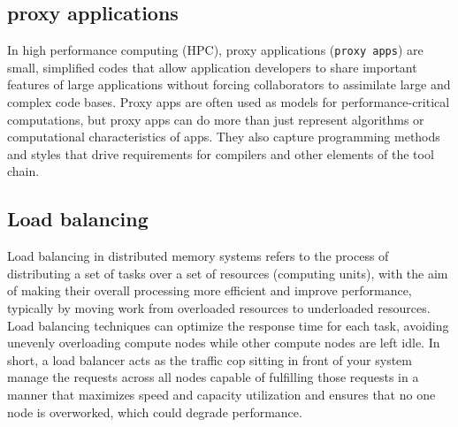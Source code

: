 \documentclass{article}
\begin{document}
\subsection{proxy applications} %
In high performance computing (HPC), proxy applications (\verb+proxy apps+) are small, simplified codes that allow application developers to share important features of large applications without forcing collaborators to assimilate large and complex code bases. 
Proxy apps are often used as models for performance-critical computations, but proxy apps can do more than just represent algorithms or computational characteristics of apps. They also capture programming methods and styles that drive requirements for compilers and other elements of the tool chain. 

\subsection{Load balancing}
Load balancing in distributed memory systems refers to the process of distributing a set of tasks over a set of resources (computing units), with the aim of making their overall processing more efficient and improve performance, typically by moving work from overloaded resources to underloaded resources. Load balancing techniques can optimize the response time for each task, avoiding unevenly overloading compute nodes while other compute nodes are left idle. In short, a load balancer acts as the traffic cop sitting in front of your system manage the requests across all nodes capable of fulfilling those requests in a manner that maximizes speed and capacity utilization and ensures that no one node is overworked, which could degrade performance. 
\end{document}
